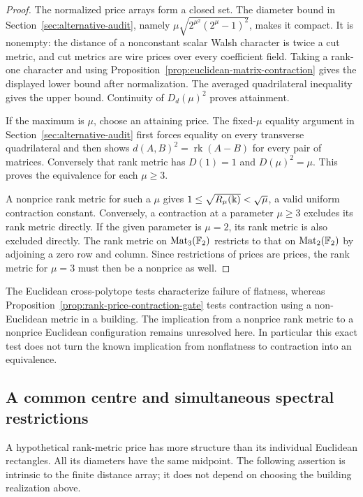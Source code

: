 \begin{proof}
The normalized price arrays form a closed set. The diameter bound
in Section~\ref{sec:alternative-audit}, namely
$\mu\sqrt{2^{\mu^2}(2^\mu-1)^2}$, makes it compact.
It is nonempty: the distance of a nonconstant scalar Walsh
character is twice a cut metric, and cut metrics are wire prices
over every coefficient field. Taking a rank-one character and
using Proposition~\ref{prop:euclidean-matrix-contraction} gives
the displayed lower bound after normalization. The averaged
quadrilateral inequality gives the upper bound. Continuity of
$D_d(\mu)^2$ proves attainment.

If the maximum is $\mu$, choose an attaining price. The fixed-$\mu$
equality argument in Section~\ref{sec:alternative-audit} first
forces equality on every transverse quadrilateral and then shows
$d(A,B)^2=\operatorname{rk}(A-B)$ for every pair of matrices.
Conversely that rank metric has $D(1)=1$ and $D(\mu)^2=\mu$.
This proves the equivalence for each $\mu\ge3$.

A nonprice rank metric for such a $\mu$ gives
$1\le\sqrt{R_\mu(\Bbbk)}<\sqrt\mu$, a valid uniform contraction
constant. Conversely, a contraction at a parameter $\mu\ge3$
excludes its rank metric directly. If the given parameter is
$\mu=2$, its rank metric is also excluded directly. The rank metric
on $\operatorname{Mat}_3(\mathbb F_2)$ restricts to that on
$\operatorname{Mat}_2(\mathbb F_2)$ by adjoining a zero row and column.
Since restrictions of prices are prices, the rank metric for
$\mu=3$ must then be a nonprice as well.
\end{proof}

The Euclidean cross-polytope tests characterize failure of flatness,
whereas Proposition~\ref{prop:rank-price-contraction-gate} tests
contraction using a non-Euclidean metric in a building.
The implication from a nonprice rank metric to a nonprice Euclidean
configuration remains unresolved here. In particular this exact
test does not turn the known implication from nonflatness to
contraction into an equivalence.

\subsection{A common centre and simultaneous spectral restrictions}

A hypothetical rank-metric price has more structure than its individual
Euclidean rectangles. All its diameters have the same midpoint. The
following assertion is intrinsic to the finite distance array; it does
not depend on choosing the building realization above.

